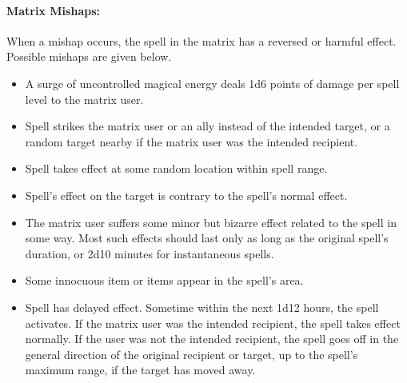 \paragraph{Matrix Mishaps:} When a mishap occurs, the spell in the matrix has a reversed or harmful effect. Possible mishaps are given below.
\begin{itemize}
 \item A surge of uncontrolled magical energy deals 1d6 points of damage per spell level to the matrix user.
 \item Spell strikes the matrix user or an ally instead of the intended target, or a random target nearby if the matrix user was the intended recipient.
 \item Spell takes effect at some random location within spell range.
 \item Spell's effect on the target is contrary to the spell's normal effect.
 \item The matrix user suffers some minor but bizarre effect related to the spell in some way. Most such effects should last only as long as the original spell's duration, or 2d10 minutes for instantaneous spells.
 \item Some innocuous item or items appear in the spell's area.
 \item Spell has delayed effect. Sometime within the next 1d12 hours, the spell activates. If the matrix user was the intended recipient, the spell takes effect normally. If the user was not the intended recipient, the spell goes off in the general direction of the original recipient or target, up to the spell's maximum range, if the target has moved away.
\end{itemize}

